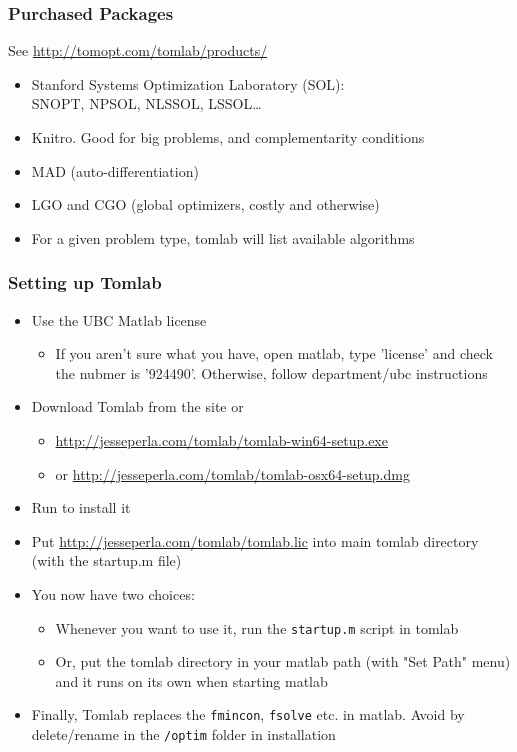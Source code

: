 \documentclass[nofootline]{etk-presentation}
\begin{document}
\begin{frame}[fragile]	\frametitle{Purchased Packages}
	See \url{http://tomopt.com/tomlab/products/}
	\begin{itemize}
		\item Stanford 
		Systems Optimization Laboratory (SOL):\\SNOPT, NPSOL, NLSSOL, LSSOL\ldots
		\item Knitro.  Good for big problems, and complementarity conditions
		\item MAD (auto-differentiation)
		\item LGO and CGO (global optimizers, costly and otherwise)
		\item For a given problem type, tomlab will list available algorithms
	\end{itemize}
\end{frame}

\begin{frame}[fragile]	\frametitle{Setting up Tomlab}
	\begin{itemize}
		\item Use the UBC Matlab license
		\begin{itemize}
			\item If you aren't sure what you have, open matlab, type 'license' and check the nubmer is '924490'.  Otherwise, follow department/ubc instructions
		\end{itemize}
		\item Download Tomlab from the site or 
		\begin{itemize}
			\item \url{http://jesseperla.com/tomlab/tomlab-win64-setup.exe }
			\item or \url{http://jesseperla.com/tomlab/tomlab-osx64-setup.dmg}
		\end{itemize}
		\item Run to install it
		\item Put \url{http://jesseperla.com/tomlab/tomlab.lic} into main tomlab directory (with the startup.m file)
		\item You now have two choices:
		\begin{itemize}
			\item Whenever you want to use it, run the \verb!startup.m! script in tomlab
			\item Or, put the tomlab directory in your matlab path (with "Set Path" menu) and it runs on its own when starting matlab
		\end{itemize}
	\item Finally, Tomlab replaces the \verb!fmincon!, \verb!fsolve! etc. in matlab.  Avoid by delete/rename in the \verb!/optim! folder in installation
	\end{itemize}
\end{frame}
\end{document}
